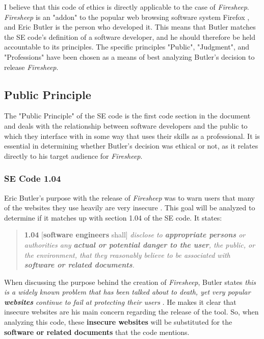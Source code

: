 \documentclass[11pt]{article}
\begin{document}
\begin{multicols}{2}
I believe that this code of ethics is directly applicable to the case of \emph{Firesheep}. \emph{Firesheep} is an "addon" to the popular web browsing software system Firefox \cite{codebutler_main}, and Eric Butler is the person who developed it. This means that Butler matches the SE code's definition of a software developer, and he should therefore be held accountable to its principles. The specific principles "Public", "Judgment", and "Professions" have been chosen as a means of best analyzing Butler's decision to release \emph{Firesheep}.

\subsection{Public Principle}
The "Public Principle" of the SE code is the first code section in the document and deals with the relationship between software developers and the public to which they interface with in some way that uses their skills as a professional. It is essential in determining whether Butler's decision was ethical or not, as it relates directly to his target audience for \emph{Firesheep}.

\subsubsection{SE Code 1.04}
Eric Butler's purpose with the release of \emph{Firesheep} was to warn users that many of the websites they use heavily are very insecure \cite{codebutler_main} \cite{toorcon_slides}. This goal will be analyzed to determine if it matches up with section 1.04 of the SE code. It states:

\begin{quote}
  \textbf{1.04} [\textbf{software engineers} shall] \emph{disclose to \textbf{appropriate persons} or authorities any \textbf{actual or potential danger to the user}, the public, or the environment, that they reasonably believe to be associated with \textbf{software or related documents}.} \cite{se_code}
\end{quote}

When discussing the purpose behind the creation of \emph{Firesheep}, Butler states \emph{this is a widely known problem that has been talked about to death, yet very popular \textbf{websites} continue to fail at protecting their users} \cite{codebutler_main}. He makes it clear that insecure websites are his main concern regarding the release of the tool. So, when analyzing this code, these \textbf{insecure websites} will be substituted for the \textbf{software or related documents}  that the code mentions.


\end{multicols}
\end{document}

